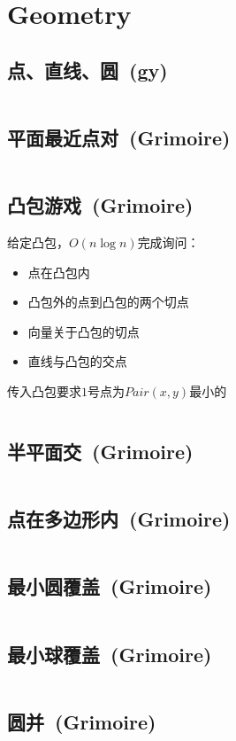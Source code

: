 \chapter{Geometry}
\section{点、直线、圆\ \small(gy)}
	\inputminted{cpp}{Geometry/basic_geometry.cpp}
\section{平面最近点对\ \small(Grimoire)}
	\inputminted{cpp}{Geometry/nearest_points.cpp}
\section{凸包游戏\ \small(Grimoire)}
	给定凸包，$ O(n \log n) $完成询问：
	\begin{itemize}
		\item 点在凸包内
		\item 凸包外的点到凸包的两个切点
		\item 向量关于凸包的切点
		\item 直线与凸包的交点
	\end{itemize}
	传入凸包要求$ 1 $号点为$ Pair(x, y) $最小的
	\inputminted{cpp}{Geometry/convex_game.cpp}
\section{半平面交\ \small(Grimoire)}
	\inputminted{cpp}{Geometry/half_plane_intersect.cpp}
\section{点在多边形内\ \small(Grimoire)}
	\inputminted{cpp}{Geometry/point_in_polygon.cpp}
\section{最小圆覆盖\ \small(Grimoire)}
	\inputminted{cpp}{Geometry/minimal_coverage_circle.cpp}
\section{最小球覆盖\ \small(Grimoire)}
	\inputminted{cpp}{Geometry/minimal_coverage_ball.cpp}
\section{圆并\ \small(Grimoire)}
	\inputminted{cpp}{Geometry/circle_union.cpp}
